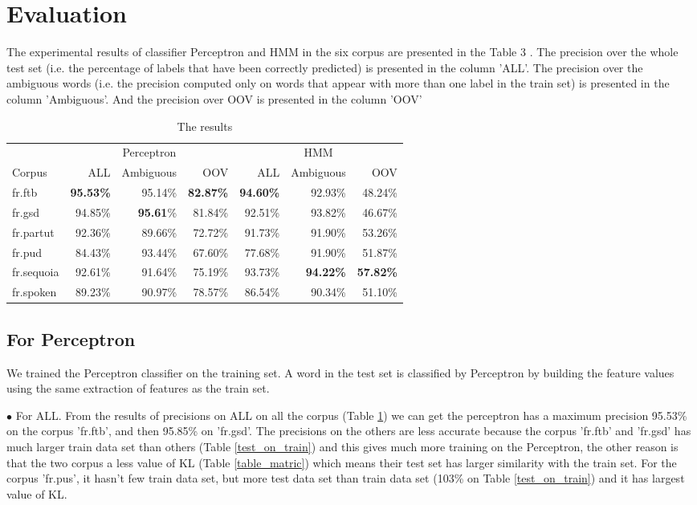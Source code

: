 \documentclass{article}
\begin{document}
\section{Evaluation}
The experimental results of classifier Perceptron and HMM in the six corpus are presented in the Table 3 . The precision over the whole test set (i.e. the percentage of labels that have been correctly predicted) is presented in the column 'ALL'. The precision over the ambiguous words (i.e. the precision computed only on words that appear with more than one label in the train set) is presented in the column 'Ambiguous'. And the precision over OOV is presented in the column 'OOV'


\begin{table}[h]
\caption{The results}
\vspace{5pt}
\centering
    
\begin{tabular}{|l|rrr|rrr|}
\hline
\multicolumn{1}{|c|}{\ } & \multicolumn{3}{c|}{Perceptron} & \multicolumn{3}{c|}{HMM}\\ 
\cline{2-7}
Corpus & ALL & Ambiguous & OOV & ALL & Ambiguous & OOV\\
\hline
fr.ftb     & \textbf{95.53\%} & 95.14\% & \textbf{82.87\%} & \textbf{94.60\%} & 92.93\% & 48.24\% \\
fr.gsd     & 94.85\% & \textbf{95.61}\% & 81.84\% & 92.51\% & 93.82\% & 46.67\% \\
fr.partut  & 92.36\% & 89.66\% & 72.72\% & 91.73\% & 91.90\% & 53.26\% \\
fr.pud     & 84.43\% & 93.44\% & 67.60\% & 77.68\% & 91.90\% & 51.87\% \\
fr.sequoia & 92.61\% & 91.64\% & 75.19\% & 93.73\% & \textbf{94.22\%} & \textbf{57.82\%} \\
fr.spoken  & 89.23\% & 90.97\% & 78.57\% & 86.54\% & 90.34\% & 51.10\% \\
\hline
\end{tabular}
\label{results}
\end{table}


\subsection{For Perceptron}
We trained the Perceptron classifier on the training set. A word in the test set is classified by Perceptron by  building the feature values using the same extraction of features as the train set. 


$\bullet$ For ALL. From the results of precisions on ALL on all the corpus (Table \ref{results}) we can get the perceptron has a maximum precision 95.53\% on the corpus 'fr.ftb', and then 95.85\% on 'fr.gsd'. The precisions on the others are less accurate because the corpus 'fr.ftb' and 'fr.gsd' has much larger train data set than others (Table \ref{test_on_train}) and this gives much more training on the Perceptron, the other reason is that the two corpus a less value of KL (Table \ref{table_matric}) which means their test set has larger similarity with the train set. For the corpus 'fr.pus', it hasn't few train data set, but more test data set than train data set (103\% on Table \ref{test_on_train}) and it has largest value of KL.
\end{document}

